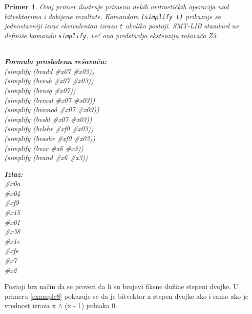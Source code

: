 \documentclass[12pt,oneside]{memoir}
\newtheorem{primer}{Primer}
\begin{document}
\begin{primer} \label{example7} 
Ovaj primer ilustruje primenu nekih aritmetičkih operacija nad bitvektorima i dobijene rezultate. Komandom \texttt{(simplify t)} prikazuje se jednostavniji izraz ekvivalentan izrazu \texttt{t} ukoliko postoji. SMT-LIB standard ne definiše komandu \texttt{simplify}, već ona predstavlja ekstenziju rešavača Z3.
\\ \\
\begin{minipage}[b]{0.5\textwidth}
\textbf{Formula prosleđena rešavaču:}
\\(simplify (bvadd \#x07 \#x03)) 
\\(simplify (bvsub \#x07 \#x03)) 
\\(simplify (bvneg \#x07))       
\\(simplify (bvmul \#x07 \#x03)) 
\\(simplify (bvsmod \#x07 \#x03)) 
\\(simplify (bvshl \#x07 \#x03)) 
\\(simplify (bvlshr \#xf0 \#x03))  
\\(simplify (bvashr \#xf0 \#x03))  
\\(simplify (bvor \#x6 \#x3)) 
\\(simplify (bvand \#x6 \#x3))   
\end{minipage}
\hspace{2.5cm}
\begin{minipage}[b]{0.5\textwidth}
\textbf{Izlaz:}
\\\#x0a 
\\\#x04 
\\\#xf9 
\\\#x15 
\\\#x01 
\\\#x38 
\\\#x1e 
\\\#xfe
\\\#x7 
\\\#x2 
\end{minipage}

\end{primer} \par
Postoji brz način da se proveri da li su brojevi fiksne dužine stepeni dvojke. U primeru \ref{example8} pokazuje se da je bitvektor x stepen dvojke ako i samo ako je vrednost izraza x $\land$ (x - 1) jednaka 0.
\end{document}
